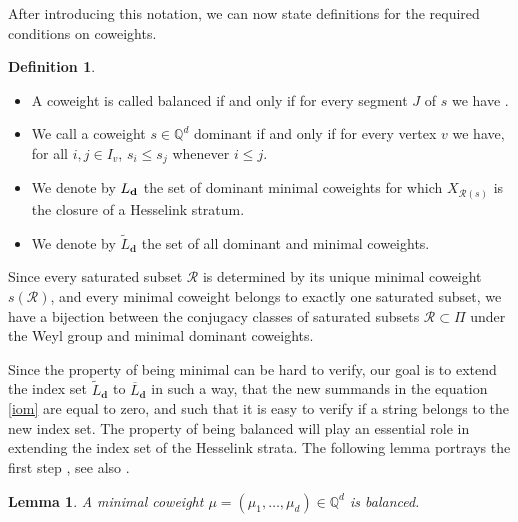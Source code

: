 \documentclass[10pt,a4paper]{amsart}
\newcommand{\R}{\mathcal{R}}
\numberwithin{equation}{section}
\newtheorem{Lemma}[Theorem]{Lemma}
\theoremstyle{definition}
\newtheorem{Definition}[Theorem]{Definition}
\begin{document}
After introducing this notation, we can now state definitions for the required conditions on coweights.
\begin{Definition} \label{baldom}\quad
\begin{itemize}\itemsep=0pt
\item[(a)] A coweight is called balanced if and only if for every segment $J$ of $s$ we have
.
\item[(b)] We call a coweight $s \in \mathbb{Q}^d$ dominant if and only if for every vertex $v$ we have, for all $i,j \in I_v$,
$
s_i \leq s_j $ whenever $ i\leq j $.
\item[(c)] We denote by $L_{\bf d}$ the set of dominant minimal coweights for which $X_{\R(s)}$ is the closure of a Hesselink stratum.

\item[(d)] We denote by $\widetilde{L}_{\mathbf{d}}$ the set of all dominant and minimal coweights.
\end{itemize}
\end{Definition}

Since every saturated subset $\R$ is determined by its unique minimal coweight $s(\R)$, and every minimal coweight belongs to exactly one saturated subset, we have a bijection between the conjugacy classes of saturated subsets $\R \subset \Pi$ under the Weyl group and minimal dominant coweights.

Since the property of being minimal can be hard to verify, our goal is to extend the index set $\widetilde{L}_{\mathbf{d}}$ to $\overline{L}_{\mathbf{d}}$ in such a way, that the new summands in the equation \eqref{iom} are equal to zero, and such that it is easy to verify if a string belongs to the new index set. The property of being balanced will play an essential role in extending the index set of the Hesselink strata. The following lemma portrays the first step \cite{LB}, see also \cite{Hesse}.

\begin{Lemma}
A minimal coweight $\mu = (\mu_1, \dots, \mu_d) \in \mathbb{Q}^d$ is balanced.
\end{Lemma}
\end{document}
